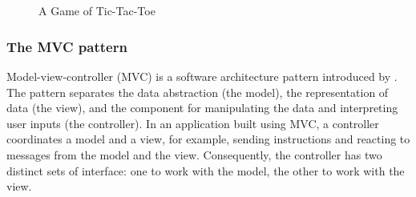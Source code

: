 \begin{figure}[p]
\begin{center}
{        }
        \\                
        \\                        
    \end{center}
     \caption{A Game of Tic-Tac-Toe}
   \label{tictactoe_example}
\end{figure}


\subsubsection{The MVC pattern}

Model-view-controller (MVC) is a software architecture pattern introduced by 
\citet{reenskaug1979original}.  The pattern separates the data abstraction
(the model), the representation of data (the view), and the component for 
manipulating the data and interpreting user inputs (the controller).  
In an application built using MVC, a controller coordinates a model and a view, for example,  
sending instructions and reacting to messages from the model and the view.  
Consequently, the controller has two distinct sets of interface: one to
work with the model, the other to work with the view.

